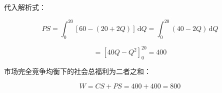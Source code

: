 \documentclass[11pt,a4paper,UTF8]{ctexart}
\begin{document}
\begin{solbox}[分步推导与答题规范]
代入解析式：


\begin{equation*}
PS = \int_0^{20} [60 - (20 + 2Q)]\,\mathrm{d}Q = \int_0^{20} (40 - 2Q)\,\mathrm{d}Q
\end{equation*}



\begin{equation*}
= \left[40Q - Q^2\right]_0^{20} = 400
\end{equation*}


市场完全竞争均衡下的社会总福利为二者之和：


\begin{equation*}
W = CS + PS = 400 + 400 = 800
\end{equation*}

\end{solbox}
\end{document}
